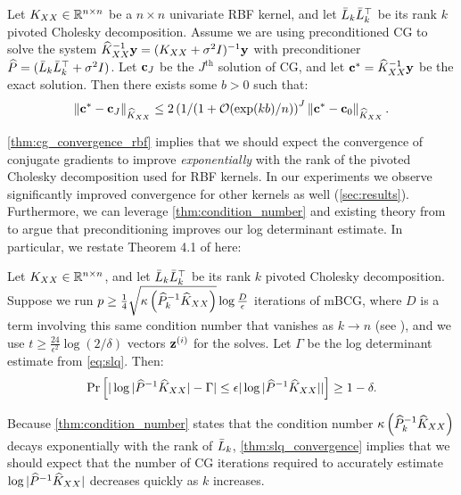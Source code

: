 \begin{theorem}
  \label{thm:cg_convergence_rbf}
  Let $K_{XX} \in \mathbb{R}^{n \times n}$ be a $n \times n$ univariate RBF kernel, and let $\bar{L}_k \bar{L}_k^\top$ be its rank $k$ pivoted Cholesky decomposition.
  Assume we are using preconditioned CG to solve the system $\widehat{K}_{XX}^{-1} \mathbf{y} = (K_{XX} + \sigma^2 I)^{-1} \mathbf{y}$ with preconditioner $\widehat{P} = (\bar{L}_k \bar{L}_k^\top + \sigma^2 I)$.
  Let $\mathbf{c}_J$ be the $J^\textrm{th}$ solution of CG, and let $\mathbf{c}^{*} = \widehat{K}_{XX}^{-1} \mathbf{y}$ be the exact solution.
  Then there exists some $b > 0$ such that:
  \begin{equation}
    \Vert \bc^{*} - \bc_{J} \Vert_{\trainK}
    \leq 2 \left(1/(1 + \bigo{\exp(kb)/n}\right)^{J} \left\Vert \bc^{*} - \bc_{0} \right\Vert_{\trainK}.
  \end{equation}
\end{theorem}
%
\cref{thm:cg_convergence_rbf} implies that we should expect the convergence of conjugate gradients to improve \emph{exponentially} with the rank of the pivoted Cholesky decomposition used for RBF kernels. In our experiments we observe significantly improved convergence for other kernels as well (\cref{sec:results}). Furthermore, we can leverage \cref{thm:condition_number} and existing theory from \cite{ubaru2017fast} to argue that preconditioning improves our log determinant estimate. In particular, we restate Theorem 4.1 of \citet{ubaru2017fast} here:
\begin{theorem}
  \label{thm:slq_convergence}
  Let $K_{XX} \in \mathbb{R}^{n \times n}$, and let $\bar{L}_k \bar{L}_k^\top$ be its rank $k$ pivoted Cholesky decomposition.
  Suppose we run $p \geq \frac{1}{4} \sqrt{ \kappa \left( \widehat{P}_{k}^{-1}\widehat{K}_{XX} \right) } \log \frac{D}{\epsilon}$ iterations of mBCG,
  where $D$ is a term involving this same condition number that vanishes as $k \to n$ (see \cite{ubaru2017fast}),
  and we use $t \geq \frac{24}{\epsilon^{2}}\log(2/\delta)$ vectors $\mathbf{z}^{(i)}$ for the solves.
  Let $\Gamma$ be the log determinant estimate from \eqref{eq:slq}. Then:
  \begin{equation}
    \textrm{Pr}\left[\vert \log \vert \widehat{P}^{-1}\widehat{K}_{XX} \vert - \Gamma \vert \leq \epsilon\vert \log \vert \widehat{P}^{-1}\widehat{K}_{XX} \vert \vert \right] \geq 1 - \delta.
  \end{equation}
\end{theorem}
Because \cref{thm:condition_number} states that the condition number $\kappa \left( \widehat{P}_{k}^{-1}\widehat{K}_{XX} \right)$ decays exponentially with the rank of $\bar{L}_{k}$, \cref{thm:slq_convergence} implies that we should expect that the number of CG iterations required to accurately estimate $\log \vert \widehat{P}^{-1}\widehat{K}_{XX} \vert$ decreases quickly as $k$ increases.
